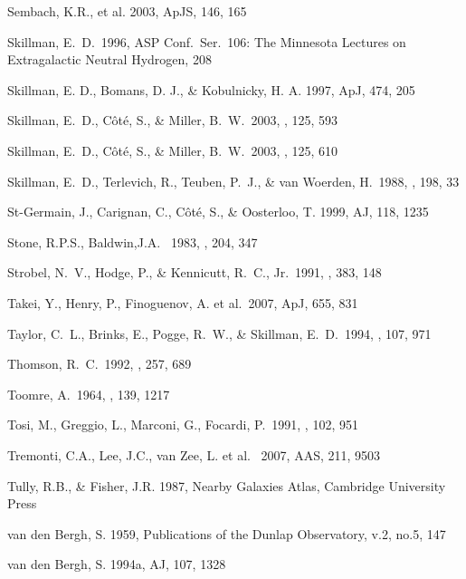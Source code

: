 \documentclass[12pt,preprint]{emulateapj}
\begin{document}
\begin{thebibliography}{}
Sembach, K.R., et al. 2003, ApJS, 146, 165

Skillman, E.~D.\ 1996, ASP Conf.~Ser.~106: 
The Minnesota Lectures on Extragalactic Neutral Hydrogen, 208 

Skillman, E. D., Bomans, D. J., \& Kobulnicky, H. A.  
1997, ApJ, 474, 205

Skillman, E.~D., C{\^o}t{\'e}, S., \& Miller, B.~W.\ 2003, \aj, 125, 593

Skillman, E.~D., C{\^o}t{\'e}, S., \& Miller, B.~W.\ 2003, \aj, 125, 610 

Skillman, E.~D., Terlevich, R., Teuben, P.~J., \& van Woerden, H.\ 1988, \aap, 198, 33 

St-Germain, J., Carignan, C., C\^ot\'e, S., \& Oosterloo, T. 1999, AJ, 118, 1235

Stone, R.P.S., Baldwin,J.A. \ 1983, \mnras, 204, 347

Strobel, N.~V., Hodge, P., \& Kennicutt, R.~C., Jr.\ 1991, \apj, 383, 148 

Takei, Y., Henry, P., Finoguenov, A. et al.\ 2007, ApJ, 655, 831 

Taylor, C.~L., Brinks, E., Pogge, R.~W., \& Skillman, E.~D.\ 1994, \aj, 107, 971 

Thomson, R.~C.\ 1992, \mnras, 257, 689 

Toomre, A.\ 1964, \apj, 139, 1217 

Tosi, M., Greggio, L., Marconi, G., Focardi, P.\ 1991, \aj, 102, 951 

Tremonti, C.A., Lee, J.C., van Zee, L. et al. \ 2007, AAS, 211, 9503

Tully, R.B., \& Fisher, J.R. 1987, Nearby Galaxies Atlas, Cambridge
University Press
 
van den Bergh, S. 1959, Publications of the Dunlap Observatory, v.2, no.5, 147

van den Bergh, S. 1994a, AJ, 107, 1328


\end{thebibliography}
\end{document}
